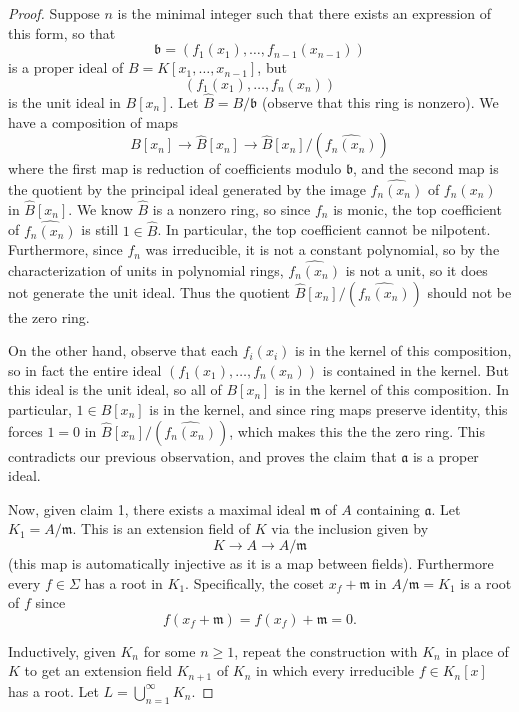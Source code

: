 \begin{proof}
Suppose $ n$ is the minimal integer such that there exists an expression of this form, so that
\[ \mathfrak{b} = (f_1(x_1), \dotsc, f_{n-1}(x_{n-1})) \]
is a proper ideal of $ B = K[x_1, \dotsc, x_{n-1}]$, but
\[ (f_1(x_1), \dotsc, f_n(x_n)) \]
is the unit ideal in $ B[x_n]$. Let $ \hat{B} = B/\mathfrak{b}$ (observe that this ring is nonzero). We have a composition of maps
\[ B[x_n] \to \hat{B}[x_n] \to \hat{B}[x_n]/(\widehat{f_n(x_n)}) \]
where the first map is reduction of coefficients modulo $ \mathfrak{b}$, and the second map is the quotient by the principal ideal generated by the image $ \widehat{f_n(x_n)}$ of $ f_n(x_n)$ in $ \hat{B}[x_n]$. We know $ \hat{B}$ is a nonzero ring, so since $ f_n$ is monic, the top coefficient of $ \widehat{f_n(x_n)}$ is still $ 1 \in \hat{B}$. In particular, the top coefficient cannot be nilpotent. Furthermore, since $ f_n$ was irreducible, it is not a constant polynomial, so by the characterization of units in polynomial rings, $ \widehat{f_n(x_n)}$ is not a unit, so it does not generate the unit ideal. Thus the quotient $ \hat{B}[x_n]/(\widehat{f_n(x_n)})$ should not be the zero ring.

On the other hand, observe that each $ f_i(x_i)$ is in the kernel of this composition, so in fact the entire ideal $ (f_1(x_1), \dotsc, f_n(x_n))$ is contained in the kernel. But this ideal is the unit ideal, so all of $ B[x_n]$ is in the kernel of this composition. In particular, $ 1 \in B[x_n]$ is in the kernel, and since ring maps preserve identity, this forces $ 1 = 0$ in $ \hat{B}[x_n]/(\widehat{f_n(x_n)})$, which makes this the the zero ring. This contradicts our previous observation, and proves the claim that $ \mathfrak{a}$ is a proper ideal.

Now, given claim 1, there exists a maximal ideal $ \mathfrak{m}$ of $ A$ containing $ \mathfrak{a}$. Let $ K_1 = A/\mathfrak{m}$. This is an extension field of $ K$ via the inclusion given by
\[ K \to A \to A/\mathfrak{m} \]
(this map is automatically injective as it is a map between fields). Furthermore every $ f \in \Sigma$ has a root in $ K_1$. Specifically, the coset $ x_f + \mathfrak{m}$ in $ A/\mathfrak{m} = K_1$ is a root of $ f$ since
\[ f(x_f + \mathfrak{m}) = f(x_f) + \mathfrak{m} = 0. \]

Inductively, given $ K_n$ for some $ n \geq 1$, repeat the construction with $ K_n$ in place of $ K$ to get an extension field $ K_{n+1}$ of $ K_n$ in which every irreducible $ f \in K_n[x]$ has a root. Let $ L = \bigcup_{n = 1}^{\infty} K_n$.


\end{proof}

